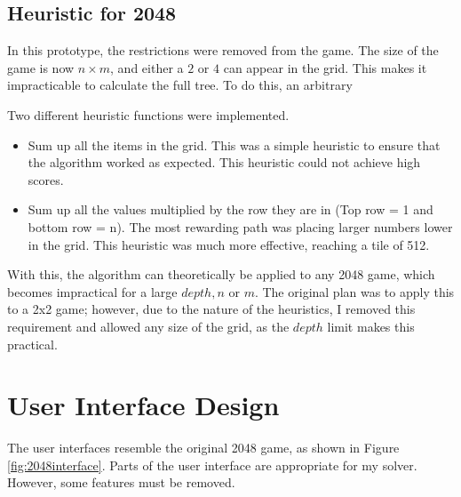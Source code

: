 \documentclass{article}
\begin{document}
\subsection{Heuristic for 2048}
\label{subsec:heuristic}
In this prototype, the restrictions were removed from the game. The size of the game is now $n \times m$, and either a $2$ or $4$ can appear in the grid. This makes it impracticable to calculate the full tree. To do this, an arbitrary  %

Two different heuristic functions were implemented.
\begin{itemize}
    \item Sum up all the items in the grid. This was a simple heuristic to ensure that the algorithm worked as expected. This heuristic could not achieve high scores.
    \item Sum up all the values multiplied by the row they are in (Top row = 1 and bottom row = n). The most rewarding path was placing larger numbers lower in the grid.  This heuristic was much more effective, reaching a tile of 512.
\end{itemize}

With this, the algorithm can theoretically be applied to any 2048 game, which becomes impractical for a large $depth, n$ or $m$. The original plan was to apply this to a 2x2 game; however, due to the nature of the heuristics, I removed this requirement and allowed any size of the grid, as the $depth$ limit makes this practical.
\section{User Interface Design}
\label{sec:ui}

The user interfaces resemble the original 2048 game, as shown in Figure \ref{fig:2048interface}.
Parts of the user interface are appropriate for my solver. However, some features must be removed.
\end{document}
